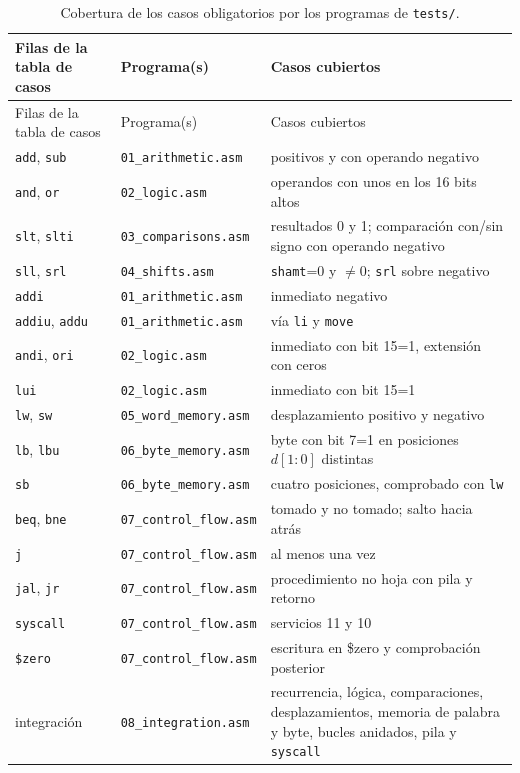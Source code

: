 \documentclass[11pt,a4paper]{article}
\begin{document}
\begin{longtable}{@{}p{4.6cm}p{4.0cm}p{6.5cm}@{}}
\caption{Cobertura de los casos obligatorios por los programas de \texttt{tests/}.}
\label{tab:cobertura}\\
\toprule
Filas de la tabla de casos & Programa(s) & Casos cubiertos \\
\midrule
\endfirsthead
\toprule
Filas de la tabla de casos & Programa(s) & Casos cubiertos \\
\midrule
\endhead
\texttt{add}, \texttt{sub} & \texttt{01\_arithmetic.asm} & positivos y con operando negativo \\
\texttt{and}, \texttt{or} & \texttt{02\_logic.asm} & operandos con unos en los 16 bits altos \\
\texttt{slt}, \texttt{slti} & \texttt{03\_comparisons.asm} & resultados 0 y 1; comparación con/sin signo con operando negativo \\
\texttt{sll}, \texttt{srl} & \texttt{04\_shifts.asm} & \texttt{shamt}=0 y $\neq$0; \texttt{srl} sobre negativo \\
\texttt{addi} & \texttt{01\_arithmetic.asm} & inmediato negativo \\
\texttt{addiu}, \texttt{addu} & \texttt{01\_arithmetic.asm} & vía \texttt{li} y \texttt{move} \\
\texttt{andi}, \texttt{ori} & \texttt{02\_logic.asm} & inmediato con bit 15=1, extensión con ceros \\
\texttt{lui} & \texttt{02\_logic.asm} & inmediato con bit 15=1 \\
\texttt{lw}, \texttt{sw} & \texttt{05\_word\_memory.asm} & desplazamiento positivo y negativo \\
\texttt{lb}, \texttt{lbu} & \texttt{06\_byte\_memory.asm} & byte con bit 7=1 en posiciones $d[1{:}0]$ distintas \\
\texttt{sb} & \texttt{06\_byte\_memory.asm} & cuatro posiciones, comprobado con \texttt{lw} \\
\texttt{beq}, \texttt{bne} & \texttt{07\_control\_flow.asm} & tomado y no tomado; salto hacia atrás \\
\texttt{j} & \texttt{07\_control\_flow.asm} & al menos una vez \\
\texttt{jal}, \texttt{jr} & \texttt{07\_control\_flow.asm} & procedimiento no hoja con pila y retorno \\
\texttt{syscall} & \texttt{07\_control\_flow.asm} & servicios 11 y 10 \\
\texttt{\$zero} & \texttt{07\_control\_flow.asm} & escritura en \$zero y comprobación posterior \\
integración & \texttt{08\_integration.asm} & recurrencia, lógica, comparaciones, desplazamientos, memoria de palabra y byte, bucles anidados, pila y \texttt{syscall} \\
\bottomrule
\end{longtable}
\end{document}
